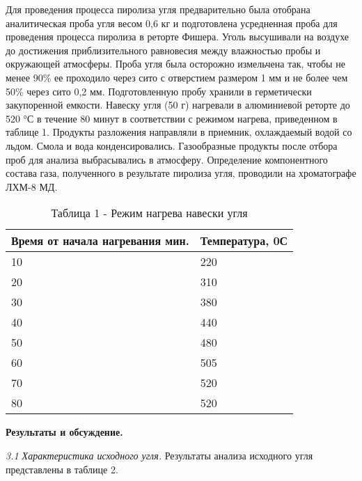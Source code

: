 \begin{multicols}{2}
Для проведения процесса пиролиза угля предварительно была отобрана
аналитическая проба угля весом 0,6 кг и подготовлена усредненная проба
для проведения процесса пиролиза в реторте Фишера. Уголь высушивали на
воздухе до достижения приблизительного равновесия между влажностью пробы
и окружающей атмосферы. Проба угля была осторожно измельчена так, чтобы
не менее 90\% ее проходило через сито с отверстием размером 1 мм и не
более чем 50\% через сито 0,2 мм. Подготовленную пробу хранили в
герметически закупоренной емкости. Навеску угля (50 г) нагревали в
алюминиевой реторте до 520 °С в течение 80 минут в соответствии с
режимом нагрева, приведенном в таблице 1. Продукты разложения направляли
в приемник, охлаждаемый водой со льдом. Смола и вода конденсировались.
Газообразные продукты после отбора проб для анализа выбрасывались в
атмосферу. Определение компонентного состава газа, полученного в
результате пиролиза угля, проводили на хроматографе ЛХМ-8 МД.
\end{multicols}

\begin{table}[H]
\caption*{Таблица 1 - Режим нагрева навески угля}
\centering
\begin{tabular}{|l|l|}
\hline
Время от начала нагревания мин. & Температура, 0С \\ \hline
10 & 220 \\ \hline
20 & 310 \\ \hline
30 & 380 \\ \hline
40 & 440 \\ \hline
50 & 480 \\ \hline
60 & 505 \\ \hline
70 & 520 \\ \hline
80 & 520 \\ \hline
\end{tabular}
\end{table}

{\bfseries Результаты и обсуждение.}

\emph{3.1 Характеристика исходного угля.} Результаты анализа исходного
угля представлены в таблице 2.

